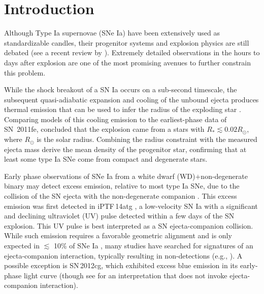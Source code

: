 \documentclass[twocolumn]{aastex61}
\newcommand{\sr}{R_\odot}
\newcommand{\ycao}[1]{{\color{red} ycao: {#1}}}
\begin{document}

\section{Introduction}
\label{sec:intro}

Although Type Ia supernovae (SNe Ia) have been extensively used as
standardizable candles, their progenitor systems and explosion
physics are still debated (see a recent review by
\citealt{2014ARA&A..52..107M}). Extremely detailed
observations in the hours to days after explosion are one of the most promising avenues to further
constrain this problem.

While the shock breakout of a SN Ia occurs on a sub-second timescale,
the subsequent quasi-adiabatic expansion and cooling of the unbound
ejecta produces thermal emission that can be used to infer the
radius of the exploding star
\citep{2010ApJ...708..598P,2011ApJ...728...63R}. Comparing models of
this cooling emission to the earliest-phase data of SN~2011fe,
\citet{2012ApJ...744L..17B} concluded that the explosion came from a 
stars with $R_\ast \lesssim 0.02\sr$, where $\sr$ is the solar
radius. Combining the radius constraint with the measured ejecta 
mass \citeauthor{2012ApJ...744L..17B} derive the mean density of the 
progenitor star, confirming that at least some type Ia SNe come from 
compact and degenerate stars. 

Early phase observations of SNe Ia from a white dwarf (WD)$+$non-degenerate binary
may detect excess emission, relative to most type Ia SNe, due to the 
collision of the SN ejecta with the non-degenerate companion 
\citep{1973ApJ...186.1007W,2010ApJ...708.1025K}. This excess 
emission was first detected in iPTF\,14atg  \citep{2015Natur.521..328C}, a low-velocity SN Ia with a significant and declining ultraviolet (UV) pulse detected within a
few days of the SN explosion. This UV pulse is best interpreted as a
SN ejecta-companion collision. While such emission requires a 
favorable geometric alignment and is only expected in $\lesssim$ 
10\% of SNe Ia \citep{2010ApJ...708.1025K}, many studies have 
searched for signatures of an ejecta-companion interaction, 
typically resulting in non-detections 
(e.g., \citealt{2010ApJ...722.1691H,2011ApJ...741...20B,2012ApJ...744...38F,
  2012ApJ...744L..17B,2015Natur.521..332O,
  2013ApJ...778L..15Z,2015ApJ...799..106G,2016ApJ...826..144S,
  2015ApJS..221...22I}). A possible exception is SN\,2012cg, 
which exhibited excess blue emission in its early-phase light curve 
\citet{2016ApJ...820...92M} (though see 
\citealt{2016arXiv161007601S} for an interpretation that does not 
invoke ejecta-companion interaction). 
\end{document}
